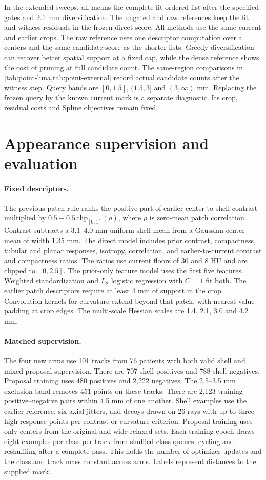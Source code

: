 In the extended sweeps, all means the complete fit-ordered list after the specified gates and 2.1 mm diversification. The ungated and raw references keep the fit and witness residuals in the frozen direct score. All methods use the same current and earlier crops. The raw reference uses one descriptor computation over all centers and the same candidate score as the shorter lists. Greedy diversification can recover better spatial support at a fixed cap, while the dense reference shows the cost of pruning at full candidate count. The same-region comparisons in \cref{tab:point-luna,tab:point-external} record actual candidate counts after the witness step. Query bands are $[0,1.5]$, $(1.5,3]$ and $(3,\infty)$ mm. Replacing the frozen query by the known current mark is a separate diagnostic. Its crop, residual costs and Spline objectives remain fixed.

\section{Appearance supervision and evaluation}
\label{sec:supp-appearance}
\paragraph{Fixed descriptors.}
The previous patch rule ranks the positive part of earlier center-to-shell contrast multiplied by $0.5+0.5\,\mathrm{clip}_{[0,1]}(\rho)$, where $\rho$ is zero-mean patch correlation. Contrast subtracts a 3.1--4.0 mm uniform shell mean from a Gaussian center mean of width 1.35 mm. The direct model includes prior contrast, compactness, tubular and planar responses, isotropy, correlation, and earlier-to-current contrast and compactness ratios. The ratios use current floors of 30 and 8 HU and are clipped to $[0,2.5]$. The prior-only feature model uses the first five features. Weighted standardization and $L_2$ logistic regression with $C=1$ fit both. The earlier patch descriptors require at least 4 mm of support in the crop. Convolution kernels for curvature extend beyond that patch, with nearest-value padding at crop edges. The multi-scale Hessian scales are 1.4, 2.1, 3.0 and 4.2 mm.

\paragraph{Matched supervision.}
The four new arms use 101 tracks from 76 patients with both valid shell and mixed proposal supervision. There are 707 shell positives and 788 shell negatives. Proposal training uses 480 positives and 2,222 negatives. The 2.5--3.5 mm exclusion band removes 451 points on these tracks. There are 2,123 training positive--negative pairs within 4.5 mm of one another. Shell examples use the earlier reference, six axial jitters, and decoys drawn on 26 rays with up to three high-response points per contrast or curvature criterion. Proposal training uses only centers from the original and wide relaxed sets. Each training epoch draws eight examples per class per track from shuffled class queues, cycling and reshuffling after a complete pass. This holds the number of optimizer updates and the class and track mass constant across arms. Labels represent distances to the supplied mark.

